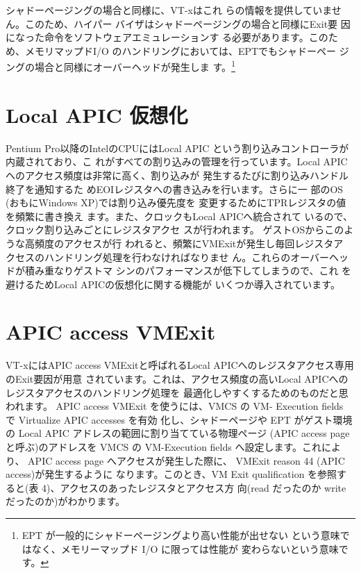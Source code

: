 \documentclass[a4j,12pt]{jarticle}
\begin{document}

 シャドーページングの場合と同様に、VT-xはこれ
らの情報を提供していません。このため、ハイパー
バイザはシャドーページングの場合と同様にExit要
因になった命令をソフトウェアエミュレーションす
る必要があります。このため、メモリマップドI/O
のハンドリングにおいては、EPTでもシャドーペー
ジングの場合と同様にオーバーヘッドが発生しま
す。\footnote[3]{
EPT が一般的にシャドーページングより高い性能が出せない
という意味ではなく、メモリーマップド I/O に限っては性能が
変わらないという意味です。
}

\section{Local APIC 仮想化}

 Pentium Pro以降のIntelのCPUにはLocal APIC
という割り込みコントローラが内蔵されており、こ
れがすべての割り込みの管理を行っています。Local
APICへのアクセス頻度は非常に高く、割り込みが
発生するたびに割り込みハンドル終了を通知するた
めEOIレジスタへの書き込みを行います。さらに一
部のOS (おもにWindows XP)では割り込み優先度を
変更するためにTPRレジスタの値を頻繁に書き換え
ます。また、クロックもLocal APICへ統合されて
いるので、クロック割り込みごとにレジスタアクセ
スが行われます。
 ゲストOSからこのような高頻度のアクセスが行
われると、頻繁にVMExitが発生し毎回レジスタア
クセスのハンドリング処理を行わなければなりませ
ん。これらのオーバーヘッドが積み重なりゲストマ
シンのパフォーマンスが低下してしまうので、これ
を避けるためLocal APICの仮想化に関する機能が
いくつか導入されています。

\section{APIC access VMExit}

 VT-xにはAPIC access VMExitと呼ばれるLocal
APICへのレジスタアクセス専用のExit要因が用意
されています。これは、アクセス頻度の高いLocal
APICへのレジスタアクセスのハンドリング処理を
最適化しやすくするためのものだと思われます。
 APIC access VMExit を使うには、VMCS の VM-
Execution fields で Virtualize APIC accesses を有効
化し、シャドーページや EPT がゲスト環境の Local
APIC アドレスの範囲に割り当てている物理ページ
(APIC access page と呼ぶ)のアドレスを VMCS の
VM-Execution fields へ設定します。これにより、
APIC access page へアクセスが発生した際に、
VMExit reason 44 (APIC access)が発生するように
なります。このとき、VM Exit qualification を参照す
ると(表 4)、アクセスのあったレジスタとアクセス方
向(read だったのか write だったのか)がわかります。
\end{document}
